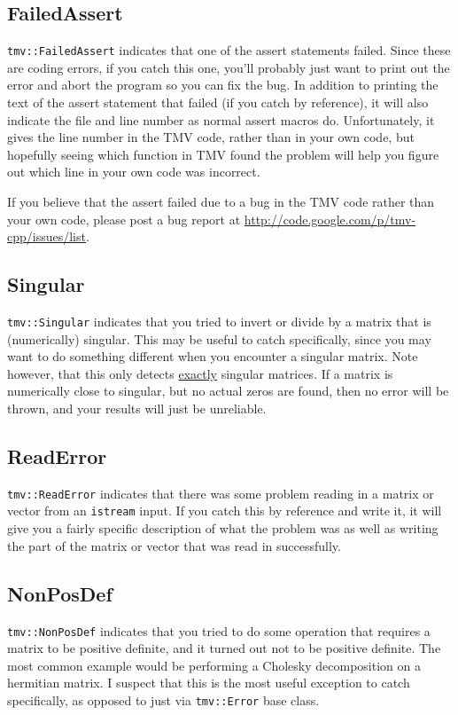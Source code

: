 \documentclass[twoside,letterpaper,11pt]{article}
\newcommand{\myissuesx}{http://code.google.com/p/tmv-cpp/issues/list}
\newcommand{\myissues}{\url{\myissuesx}}
\renewcommand{\tt}[1]{{\lstinline {#1}}}
\begin{document}
\subsection{FailedAssert}
\tt{tmv::FailedAssert} indicates that one of the assert statements failed.
Since these are coding errors,
if you catch this one, you'll probably just want to print out the error and abort
the program so you can fix the bug.  In addition to printing the text of the
assert statement that failed (if you catch by reference), it will also indicate
the file and line number as normal assert macros do.  Unfortunately, it gives the 
line number in the TMV code, rather than in your own code, but hopefully seeing
which function in TMV found the problem will help you figure out which line
in your own code was incorrect.

If you believe that the assert failed due to a bug in the TMV code
rather than your own code, please post a bug report at \myissues.

\subsection{Singular}
\tt{tmv::Singular} indicates that you tried to invert or divide by a matrix
that is (numerically) singular.  This may be useful to catch specifically,
since you may want to do something different when you encounter a singular
matrix.  Note however, that this only detects \underline{exactly} singular
matrices.  If a matrix is numerically close to singular, but no actual 
zeros are found, then no error will be thrown, and your results will just be 
unreliable.

\subsection{ReadError}
\tt{tmv::ReadError} indicates that there was some problem reading in a matrix or 
vector from an \tt{istream} input.  If you catch this by reference and write it,
it will give you a fairly specific description of what the problem was as well as
writing the part of the matrix or vector that was read in successfully.

\subsection{NonPosDef}
\label{nonposdef}
\tt{tmv::NonPosDef} indicates that you tried to do some operation that requires
a matrix to be positive definite, and it turned out not to be positive definite.
The most common example would be performing a Cholesky decomposition on a 
hermitian matrix.  I suspect that this is the 
most useful exception to catch specifically, as opposed to just via \tt{tmv::Error} base class.
\end{document}
